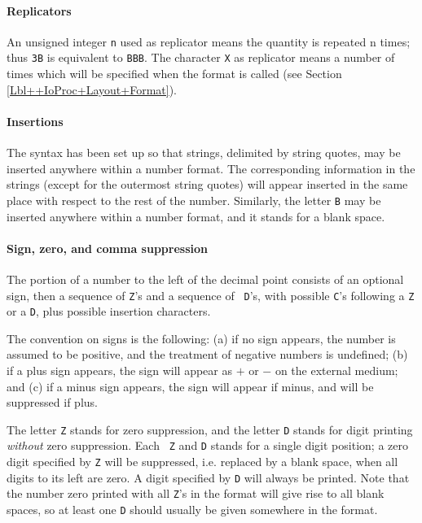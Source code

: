 \documentclass[a4paper,11pt]{article}
\begin{document}
\paragraph{Replicators}
\label{Lbl++Formats+Number+Semantics+Replicators}
An unsigned integer {\tt n} used as replicator means the quantity is
repeated n times; thus {\tt 3B} is equivalent to {\tt BBB}. The
character {\tt X} as replicator means a number of times which will be
specified when the format is called (see Section
\ref{Lbl++IoProc+Layout+Format}).

\paragraph{Insertions}
The syntax has been set up so that strings, delimited by string
quotes, may be inserted anywhere within a number format. The
corresponding information in the strings (except for the outermost
string quotes) will appear inserted in the same place with respect to
the rest of the number. Similarly, the letter {\tt B} may be inserted
anywhere within a number format, and it stands for a blank space.

\paragraph{Sign, zero, and comma suppression}
\label{Lbl++Formats+Number+Semantics+SignZeroComma}

The portion of a number to the left of the decimal point consists of
an optional sign, then a sequence of {\tt Z}'s and a sequence of {\tt
D}'s, with possible {\tt C}'s following a {\tt Z} or a {\tt D}, plus
possible insertion characters.

The convention on signs is the following: (a) if no sign appears, the
number is assumed to be positive, and the treatment of negative
numbers is undefined; (b) if a plus sign appears, the sign will appear
as $+$ or $-$ on the external medium; and (c) if a minus sign appears,
the sign will appear if minus, and will be suppressed if plus.

The letter {\tt Z} stands for zero suppression, and the letter {\tt D}
stands for digit printing {\it without} zero suppression.  Each {\tt
Z} and {\tt D} stands for a single digit position; a zero digit
specified by {\tt Z} will be suppressed, i.e. replaced by a blank
space, when all digits to its left are zero.  A digit specified by
{\tt D} will always be printed.  Note that the number zero printed
with all {\tt Z}'s in the format will give rise to all blank spaces,
so at least one {\tt D} should usually be given somewhere in the
format.
\end{document}
